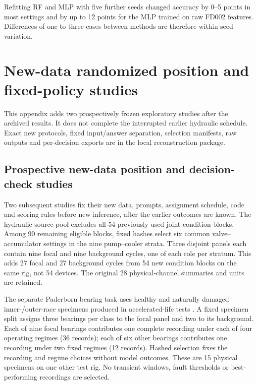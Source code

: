 \documentclass[11pt,a4paper]{article}
\begin{document}
Refitting RF and MLP with five further seeds changed accuracy by 0--5 points in most settings and by up to 12 points for the MLP trained on raw FD002 features. Differences of one to three cases between methods are therefore within seed variation.


\FloatBarrier


\clearpage\section{New-data randomized position and fixed-policy studies}

\label{sec:policy_supp}

This appendix adds two prospectively frozen exploratory studies after the archived results. It does not complete the interrupted earlier hydraulic schedule. Exact new protocols, fixed input/answer separation, selection manifests, raw outputs and per-decision exports are in the local reconstruction package.

\subsection{Prospective new-data position and decision-check studies}
Two subsequent studies fix their new data, prompts, assignment schedule, code and scoring rules before new inference, after the earlier outcomes are known. The hydraulic source pool excludes all 54 previously used joint-condition blocks. Among 90 remaining eligible blocks, fixed hashes select six common valve--accumulator settings in the nine pump--cooler strata. Three disjoint panels each contain nine focal and nine background cycles, one of each role per stratum. This adds 27 focal and 27 background cycles from 54 new condition blocks on the same rig, not 54 devices. The original 28 physical-channel summaries and units are retained.

The separate Paderborn bearing task uses healthy and naturally damaged inner-/outer-race specimens produced in accelerated-life tests \citep{lessmeier2016benchmark}. A fixed specimen split assigns three bearings per class to the focal panel and two to its background. Each of nine focal bearings contributes one complete recording under each of four operating regimes (36 records); each of six other bearings contributes one recording under two fixed regimes (12 records). Hashed selection fixes the recording and regime choices without model outcomes. These are 15 physical specimens on one other test rig. No transient windows, fault thresholds or best-performing recordings are selected.
\end{document}

